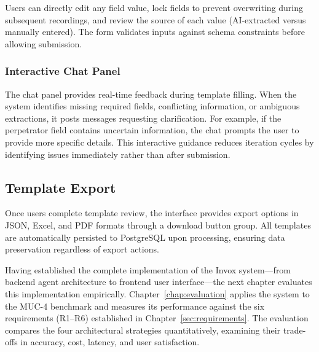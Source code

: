 Users can directly edit any field value, lock fields to prevent overwriting during subsequent recordings, and review the source of each value (AI-extracted versus manually entered). The form validates inputs against schema constraints before allowing submission.

\subsubsection{Interactive Chat Panel}

The chat panel provides real-time feedback during template filling. When the system identifies missing required fields, conflicting information, or ambiguous extractions, it posts messages requesting clarification. For example, if the perpetrator field contains uncertain information, the chat prompts the user to provide more specific details. This interactive guidance reduces iteration cycles by identifying issues immediately rather than after submission.

\subsection{Template Export}

Once users complete template review, the interface provides export options in JSON, Excel, and PDF formats through a download button group. All templates are automatically persisted to PostgreSQL upon processing, ensuring data preservation regardless of export actions.

Having established the complete implementation of the Invox system—from backend agent architecture to frontend user interface—the next chapter evaluates this implementation empirically. Chapter~\ref{chap:evaluation} applies the system to the MUC-4 benchmark and measures its performance against the six requirements (R1–R6) established in Chapter~\ref{sec:requirements}. The evaluation compares the four architectural strategies quantitatively, examining their trade-offs in accuracy, cost, latency, and user satisfaction.